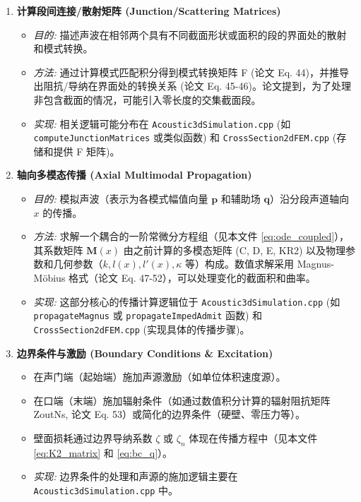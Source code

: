 \documentclass{ctexart}
\begin{document}
\begin{enumerate}
    \item \textbf{计算段间连接/散射矩阵 (Junction/Scattering Matrices)}
        \begin{itemize}
            \item \textit{目的:} 描述声波在相邻两个具有不同截面形状或面积的段的界面处的散射和模式转换。
            \item \textit{方法:} 通过计算模式匹配积分得到模式转换矩阵 F (论文 Eq. 44)，并推导出阻抗/导纳在界面处的转换关系 (论文 Eq. 45-46)。论文提到，为了处理非包含截面的情况，可能引入零长度的交集截面段。
            \item \textit{实现:} 相关逻辑可能分布在 \texttt{Acoustic3dSimulation.cpp} (如 \texttt{computeJunctionMatrices} 或类似函数) 和 \texttt{CrossSection2dFEM.cpp} (存储和提供 F 矩阵)。
        \end{itemize}

    \item \textbf{轴向多模态传播 (Axial Multimodal Propagation)}
        \begin{itemize}
            \item \textit{目的:} 模拟声波（表示为各模式幅值向量 $\mathbf{p}$ 和辅助场 $\mathbf{q}$）沿分段声道轴向 $x$ 的传播。
            \item \textit{方法:} 求解一个耦合的一阶常微分方程组（见本文件 \eqref{eq:ode_coupled}），其系数矩阵 $\mathbf{M}(x)$ 由之前计算的多模态矩阵 (C, D, E, KR2) 以及物理参数和几何参数（$k, l(x), l'(x), \kappa$ 等）构成。数值求解采用 Magnus-Möbius 格式（论文 Eq. 47-52），可以处理变化的截面积和曲率。
            \item \textit{实现:} 这部分核心的传播计算逻辑位于 \texttt{Acoustic3dSimulation.cpp} (如 \texttt{propagateMagnus} 或 \texttt{propagateImpedAdmit} 函数) 和 \texttt{CrossSection2dFEM.cpp} (实现具体的传播步骤)。
        \end{itemize}

    \item \textbf{边界条件与激励 (Boundary Conditions \& Excitation)}
        \begin{itemize}
            \item 在声门端（起始端）施加声源激励（如单位体积速度源）。
            \item 在口端（末端）施加辐射条件（如通过数值积分计算的辐射阻抗矩阵 ZoutNs, 论文 Eq. 53）或简化的边界条件（硬壁、零压力等）。
            \item 壁面损耗通过边界导纳系数 $\zeta$ 或 $\zeta_n$ 体现在传播方程中（见本文件 \eqref{eq:K2_matrix} 和 \eqref{eq:bc_q}）。
            \item \textit{实现:} 边界条件的处理和声源的施加逻辑主要在 \texttt{Acoustic3dSimulation.cpp} 中。
        \end{itemize}


\end{enumerate}
\end{document}
